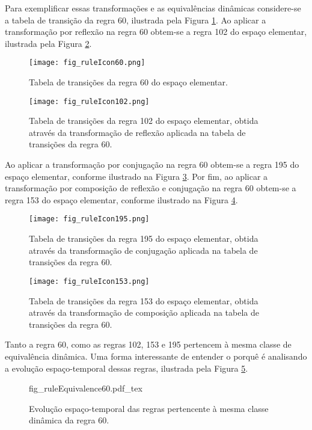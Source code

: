 Para exemplificar essas transformações e as equivalências dinâmicas considere-se a tabela de transição da regra 60, ilustrada pela Figura \ref{fig:table60}. Ao aplicar a transformação por reflexão na regra 60 obtem-se a regra 102 do espaço elementar, ilustrada pela Figura \ref{fig:table102}.

	\begin{figure}[h!]
	  \centering
	  \texttt{[image: fig\_ruleIcon60.png]}
	  \caption{Tabela de transições da regra 60 do espaço elementar.}
	  \label{fig:table60}
	\end{figure}

	\begin{figure}[h!]
	  \centering
	  \texttt{[image: fig\_ruleIcon102.png]}
	  \caption{Tabela de transições da regra 102 do espaço elementar, obtida através da transformação de reflexão aplicada na tabela de transições da regra 60.}
	  \label{fig:table102}
	\end{figure}

Ao aplicar a transformação por conjugação na regra 60 obtem-se a regra 195 do espaço elementar, conforme ilustrado na Figura \ref{fig:table195}. Por fim, ao aplicar a transformação por composição de reflexão e conjugação na regra 60 obtem-se a regra 153 do espaço elementar, conforme ilustrado na Figura \ref{fig:table153}.

	\begin{figure}[h!]
	  \centering
	  \texttt{[image: fig\_ruleIcon195.png]}
	  \caption{Tabela de transições da regra 195 do espaço elementar, obtida através da transformação de conjugação aplicada na tabela de transições da regra 60.}
	  \label{fig:table195}
	\end{figure}

	\begin{figure}[h!]
	  \centering
	  \texttt{[image: fig\_ruleIcon153.png]}
	  \caption{Tabela de transições da regra 153 do espaço elementar, obtida através da transformação de composição aplicada na tabela de transições da regra 60.}
	  \label{fig:table153}
	\end{figure}

Tanto a regra 60, como as regras 102, 153 e 195 pertencem à mesma classe de equivalência dinâmica. Uma forma interessante de entender o porquê é analisando a evolução espaço-temporal dessas regras, ilustrada pela Figura \ref{fig:dynamicEquivalecy}.

	\begin{figure}[h!]
	  \centering
	  \def\svgscale{0.45}
	  {fig_ruleEquivalence60.pdf_tex}
	  \caption{Evolução espaço-temporal das regras pertencente à mesma classe dinâmica da regra 60.}
	  \label{fig:dynamicEquivalecy}
	\end{figure}

